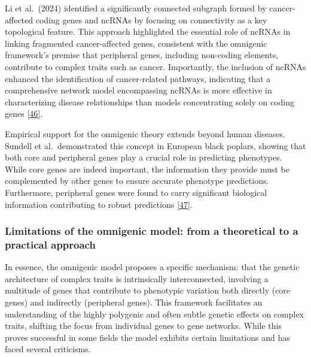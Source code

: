 Li et al.~(2024) identified a significantly connected subgraph formed by cancer-affected coding genes and ncRNAs by focusing on connectivity as a key topological feature.
This approach highlighted the essential role of ncRNAs in linking fragmented cancer-affected genes, consistent with the omnigenic framework's premise that peripheral genes, including non-coding elements, contribute to complex traits such as cancer.
Importantly, the inclusion of ncRNAs enhanced the identification of cancer-related pathways, indicating that a comprehensive network model encompassing ncRNAs is more effective in characterizing disease relationships than models concentrating solely on coding genes {[}\protect\hyperlink{ref-13VkGrWQR}{46}{]}.

Empirical support for the omnigenic theory extends beyond human diseases.
Sundell et al.~demonstrated this concept in European black poplars, showing that both core and peripheral genes play a crucial role in predicting phenotypes.
While core genes are indeed important, the information they provide must be complemented by other genes to ensure accurate phenotype predictions.
Furthermore, peripheral genes were found to carry significant biological information contributing to robust predictions {[}\protect\hyperlink{ref-EgquVUSg}{47}{]}.

\hypertarget{limitations-of-the-omnigenic-model-from-a-theoretical-to-a-practical-approach}{%
\subsubsection{Limitations of the omnigenic model: from a theoretical to a practical approach}\label{limitations-of-the-omnigenic-model-from-a-theoretical-to-a-practical-approach}}

In essence, the omnigenic model proposes a specific mechanism: that the genetic architecture of complex traits is intrinsically interconnected, involving a multitude of genes that contribute to phenotypic variation both directly (core genes) and indirectly (peripheral genes).
This framework facilitates an understanding of the highly polygenic and often subtle genetic effects on complex traits, shifting the focus from individual genes to gene networks.
While this proves successful in some fields the model exhibits certain limitations and has faced several criticisms.

